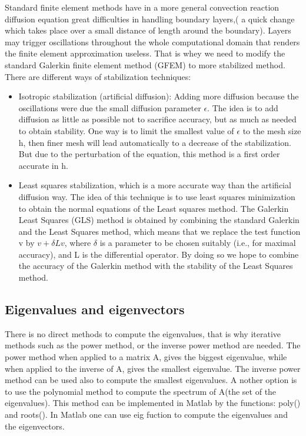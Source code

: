 \documentclass[a4paper,10pt,twoside]{article}
\begin{document}
Standard finite element methods have in a more general convection reaction diffusion equation great difficulties in handling boundary layers,( a quick change which takes place over a small distance of length around the boundary). Layers may trigger oscillations throughout the whole computational domain
that renders the finite element approximation useless. That is whey we need to modify the standard Galerkin finite element method (GFEM) to more stabilized method. There are different ways of stabilization techniques:
\begin{itemize}
    \item Isotropic stabilization (artificial diffusion): Adding more diffusion because the oscillations were due the small diffusion parameter $\epsilon$. The idea is to add diffusion as little as possible not to
sacrifice accuracy, but as much as needed to obtain stability. One way is to limit the smallest value of $\epsilon$ to the mesh size h, then finer mesh will lead automatically to a decrease of the stabilization. But due to the perturbation of the equation, this method is a first order accurate in h.
    \item Least squares stabilization, which is a more accurate way than the artificial diffusion way. The idea of this technique is to use least squares minimization to obtain the normal equations of the Least squares method. The Galerkin Least Squares (GLS) method is obtained by combining the standard
Galerkin and the Least Squares method, which means that we replace the test function v by $ v+ \delta Lv$, where $ \delta $ is a parameter to be chosen suitably (i.e., for maximal
accuracy), and L is the differential operator. By doing so we hope to combine the accuracy of the Galerkin method with the stability of the
Least Squares method.
\end{itemize}

\subsection{Eigenvalues and eigenvectors}
There is no direct methods to compute the eigenvalues, that is why iterative methods such as the power method, or the inverse power method are needed. The power method when applied to a matrix A, gives the biggest eigenvalue, while when applied to the inverse of A, gives the smallest eigenvalue. The inverse power method can be used also to compute the smallest eigenvalues. A nother option is to use the polynomial method to compute the spectrum of A(the set of the eigenvalues). This method can be implemented in Matlab by the functions: poly() and roots(). In Matlab one can use eig fuction to compute the eigenvalues and the eigenvectors.
\end{document}
